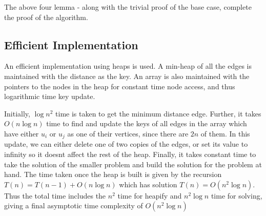 \documentclass{article}
\begin{document}
The above four lemma - along with the trivial proof of the base case, complete the proof of the algorithm.

\subsection{Efficient Implementation}
An efficient implementation using heaps is used.
A min-heap of all the edges is maintained with the distance as the key.
An array is also maintained with the pointers to the nodes in the heap for constant time node access, and thus logarithmic time key update.
\par
Initially, $\log{n^{2}}$ time is taken to get the minimum distance edge.
Further, it takes $O(n \log{n})$ time to find and update the keys of all edges in the array which have either $u_{i}$ or $u_{j}$ as one of their vertices, since there are $2n$ of them.
In this update, we can either delete one of two copies of the edges, or set its value to infinity so it doesnt affect the rest of the heap.
Finally, it takes constant time to take the solution of the smaller problem and build the solution for the problem at hand.
The time taken once the heap is built is given by the recursion $T(n) = T(n-1) + O(n \log{n})$ which has solution $T(n) = O(n^{2} \log{n})$.
Thus the total time includes the $n^{2}$ time for heapify and $n^{2} \log{n}$ time for solving, giving a final asymptotic time complexity of $O(n^{2} \log{n})$
\end{document}
